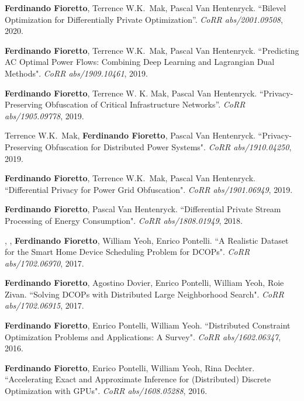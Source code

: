 \item
{\bf Ferdinando Fioretto}, Terrence W.K.~Mak, Pascal Van Hentenryck. 
{``Bilevel Optimization for Differentially Private Optimization''}.
\emph{CoRR abs/2001.09508}, 2020. 


\item 
	{\bf Ferdinando Fioretto}, Terrence W.K.~Mak, Pascal Van Hentenryck.
	{``Predicting AC Optimal Power Flows: Combining Deep Learning and Lagrangian Dual Methods"}.
	\emph{CoRR abs/1909.10461}, 2019.

\item {\bf Ferdinando Fioretto}, Terrence W. K. Mak, Pascal Van Hentenryck. 
	{``Privacy-Preserving Obfuscation of Critical Infrastructure Networks''}. 
	\emph{CoRR abs/1905.09778}, 2019.

\item 
	Terrence W.K.~Mak, {\bf Ferdinando Fioretto}, Pascal Van Hentenryck.
	{``Privacy-Preserving Obfuscation for Distributed Power Systems"}.
	\emph{CoRR abs/1910.04250}, 2019.

\item
	{\bf Ferdinando Fioretto}, Terrence W.K.~Mak, Pascal Van Hentenryck.
	{``Differential Privacy for Power Grid Obfuscation"}.
	\emph{CoRR abs/1901.06949}, 2019.

\item 
	{\bf Ferdinando Fioretto}, Pascal Van Hentenryck.
	{``Differential Private Stream Processing of Energy Consumption"}.
	\emph{CoRR abs/1808.01949}, 2018.

\item 
	, , {\bf Ferdinando Fioretto}, William Yeoh, Enrico Pontelli.
	{``A Realistic Dataset for the Smart Home Device Scheduling Problem for DCOPs"}. 
	\emph{CoRR abs/1702.06970}, 2017.

\item 
	{\bf Ferdinando Fioretto}, Agostino Dovier, Enrico Pontelli, William Yeoh, Roie Zivan. 
	{``Solving DCOPs with Distributed Large Neighborhood Search"}. 
	\emph{CoRR abs/1702.06915}, 2017.

\item 
	{\bf Ferdinando Fioretto}, Enrico Pontelli, William Yeoh.
	{``Distributed Constraint Optimization Problems and Applications: A Survey"}. 
	\emph{CoRR abs/1602.06347}, 2016.

\item 
	{\bf Ferdinando Fioretto}, Enrico Pontelli, William Yeoh, Rina Dechter.
	{``Accelerating Exact and Approximate Inference for (Distributed) Discrete Optimization with GPUs"}. 
	\emph{CoRR abs/1608.05288}, 2016.

\endEnum

